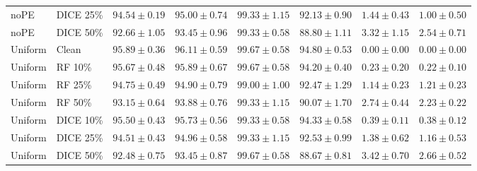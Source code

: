 {\begin{longtable}{llrrrrrr}
noPE & DICE 25\% & $94.54\pm0.19$ & $95.00\pm0.74$ & $99.33\pm1.15$ & $92.13\pm0.90$ & $1.44\pm0.43$ & $1.00\pm0.50$ \\
noPE & DICE 50\% & $92.66\pm1.05$ & $93.45\pm0.96$ & $99.33\pm0.58$ & $88.80\pm1.11$ & $3.32\pm1.15$ & $2.54\pm0.71$ \\
Uniform & Clean & $95.89\pm0.36$ & $96.11\pm0.59$ & $99.67\pm0.58$ & $94.80\pm0.53$ & $0.00\pm0.00$ & $0.00\pm0.00$ \\
Uniform & RF 10\% & $95.67\pm0.48$ & $95.89\pm0.67$ & $99.67\pm0.58$ & $94.20\pm0.40$ & $0.23\pm0.20$ & $0.22\pm0.10$ \\
Uniform & RF 25\% & $94.75\pm0.49$ & $94.90\pm0.79$ & $99.00\pm1.00$ & $92.47\pm1.29$ & $1.14\pm0.23$ & $1.21\pm0.23$ \\
Uniform & RF 50\% & $93.15\pm0.64$ & $93.88\pm0.76$ & $99.33\pm1.15$ & $90.07\pm1.70$ & $2.74\pm0.44$ & $2.23\pm0.22$ \\
Uniform & DICE 10\% & $95.50\pm0.43$ & $95.73\pm0.56$ & $99.33\pm0.58$ & $94.33\pm0.58$ & $0.39\pm0.11$ & $0.38\pm0.12$ \\
Uniform & DICE 25\% & $94.51\pm0.43$ & $94.96\pm0.58$ & $99.33\pm1.15$ & $92.53\pm0.99$ & $1.38\pm0.62$ & $1.16\pm0.53$ \\
Uniform & DICE 50\% & $92.48\pm0.75$ & $93.45\pm0.87$ & $99.67\pm0.58$ & $88.67\pm0.81$ & $3.42\pm0.70$ & $2.66\pm0.52$ \\
\end{longtable}
}

